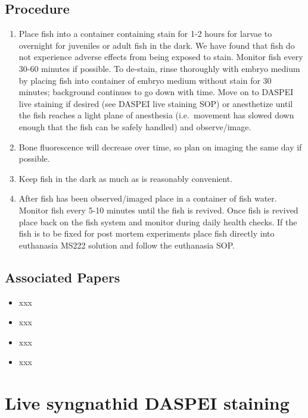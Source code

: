 \documentclass[
  letterpaper,
  DIV=11,
  numbers=noendperiod]{scrreprt}
\providecommand{\tightlist}{%
  \setlength{\itemsep}{0pt}\setlength{\parskip}{0pt}}\usepackage{longtable,booktabs,array}
\begin{document}
\hypertarget{procedure-81}{%
\section{Procedure}\label{procedure-81}}

\begin{enumerate}
\def\labelenumi{\arabic{enumi}.}
\tightlist
\item
  Place fish into a container containing stain for 1-2 hours for larvae
  to overnight for juveniles or adult fish in the dark. We have found
  that fish do not experience adverse effects from being exposed to
  stain. Monitor fish every 30-60 minutes if possible. To de-stain,
  rinse thoroughly with embryo medium by placing fish into container of
  embryo medium without stain for 30 minutes; background continues to go
  down with time. Move on to DASPEI live staining if desired (see DASPEI
  live staining SOP) or anesthetize until the fish reaches a light plane
  of anesthesia (i.e.~movement has slowed down enough that the fish can
  be safely handled) and observe/image.
\item
  Bone fluorescence will decrease over time, so plan on imaging the same
  day if possible.
\item
  Keep fish in the dark as much as is reasonably convenient.
\item
  After fish has been observed/imaged place in a container of fish
  water. Monitor fish every 5-10 minutes until the fish is revived. Once
  fish is revived place back on the fish system and monitor during daily
  health checks. If the fish is to be fixed for post mortem experiments
  place fish directly into euthanasia MS222 solution and follow the
  euthanasia SOP.
\end{enumerate}

\hypertarget{associated-papers-56}{%
\section{Associated Papers}\label{associated-papers-56}}

\begin{itemize}
\tightlist
\item
  xxx
\item
  xxx
\item
  xxx
\item
  xxx
\end{itemize}

\hypertarget{sec-vert_exp-live_daspei_syngnathid}{%
\chapter{Live syngnathid DASPEI
staining}\label{sec-vert_exp-live_daspei_syngnathid}}
\end{document}
